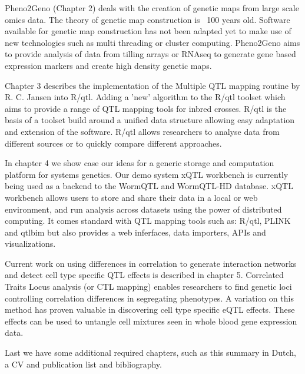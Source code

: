 Pheno2Geno (Chapter 2) deals with the creation of genetic maps from large scale omics data. 
The theory of genetic map construction is ~100 years old. Software available for genetic map 
construction has not been adapted yet to make use of new technologies such as multi threading 
or cluster computing. Pheno2Geno aims to provide analysis of data from tilling arrays or RNAseq 
to generate gene based expression markers and create high density genetic maps.

Chapter 3 describes the implementation of the Multiple QTL mapping routine by R. C. Jansen into 
R/qtl. Adding a 'new' algorithm to the R/qtl toolset which aims to provide a range of QTL 
mapping tools for inbred crosses. R/qtl is the basis of a toolset build around a unified 
data structure allowing easy adaptation and extension of the software. R/qtl allows researchers 
to analyse data from different sources or to quickly compare different approaches.

In chapter 4 we show case our ideas for a generic storage and computation platform for systems 
genetics. Our demo system xQTL workbench is currently being used as a backend to the 
WormQTL and WormQTL-HD database. xQTL workbench allows users to store and share their data in 
a local or web environment, and run analysis across datasets using the power of distributed 
computing. It comes standard with QTL mapping tools such as: R/qtl, PLINK and qtlbim but also
provides a web inferfaces, data importers, APIs and visualizations.

Current work on using differences in correlation to generate interaction networks and detect 
cell type specific QTL effects is described in chapter 5. Correlated Traits Locus analysis 
(or CTL mapping) enables researchers to find genetic loci controlling correlation differences 
in segregating phenotypes. A variation on this method has proven valuable in discovering cell 
type specific eQTL effects. These effects can be used to untangle cell mixtures seen in whole 
blood gene expression data.


Last we have some additional required chapters, such as this summary in Dutch, a CV and publication 
list and bibliography.\\


